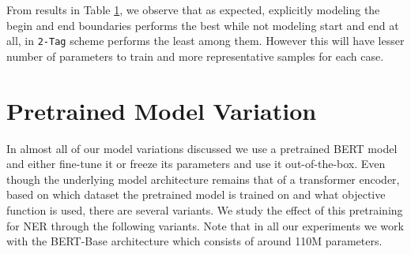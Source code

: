 From results in Table \ref{}, we observe that as expected, explicitly modeling the begin and end boundaries performs the best while not modeling start and end at all, in \texttt{2-Tag} scheme performs the least among them. However this will have lesser number of parameters to train and more representative samples for each case.

\section{Pretrained Model Variation}
In almost all of our model variations discussed we use a pretrained BERT model and either fine-tune it or freeze its parameters and use it out-of-the-box. Even though the underlying model architecture remains that of a transformer encoder, based on which dataset the pretrained model is trained on and what objective function is used, there are several variants. We study the effect of this pretraining for NER through the following variants. Note that in all our experiments we work with the BERT-Base architecture which consists of around 110M parameters.

